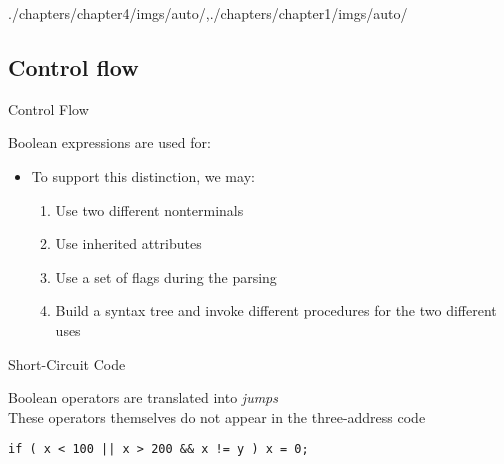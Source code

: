 \begin{graphicspathcontext}{{./chapters/chapter4/imgs/auto/},{./chapters/chapter1/imgs/auto/}}
\begin{bibunit}[apalike]
\subsection{Control flow}
\subsectiontableofcontentslide

\begin{frame}{Control Flow}
	\vspace{.25cm}
	\begin{block}{Boolean expressions are used for:}
		\begin{center}
			\hspace{1cm}
		\end{center}
	\end{block}
	\begin{itemize}
	\item To support this distinction, we may:
		\begin{enumerate}
		\item Use two different nonterminals
		\item Use inherited attributes
		\item Use a set of flags during the parsing
		\item Build a syntax tree and invoke different procedures for the two different uses
		\end{enumerate}
	\end{itemize}
\end{frame}

\begin{frame}[t,fragile]{Short-Circuit Code}
	\begin{definition}
		Boolean operators are translated into \emph{jumps} \\
		These operators themselves do not appear in the three-address code
	\end{definition}
	\vspace{.25cm}
	\vspace{.25cm}
	\begin{example}
		\begin{lstlisting}[style=lststyle-java]
if ( x < 100 || x > 200 && x != y ) x = 0;
		\end{lstlisting}
		\vspace{-.5cm}
		\begin{tac}[.6\linewidth]
		\tacdots[L2]
		\end{tac}
	\end{example}
\end{frame}


\end{bibunit}
\end{graphicspathcontext}
